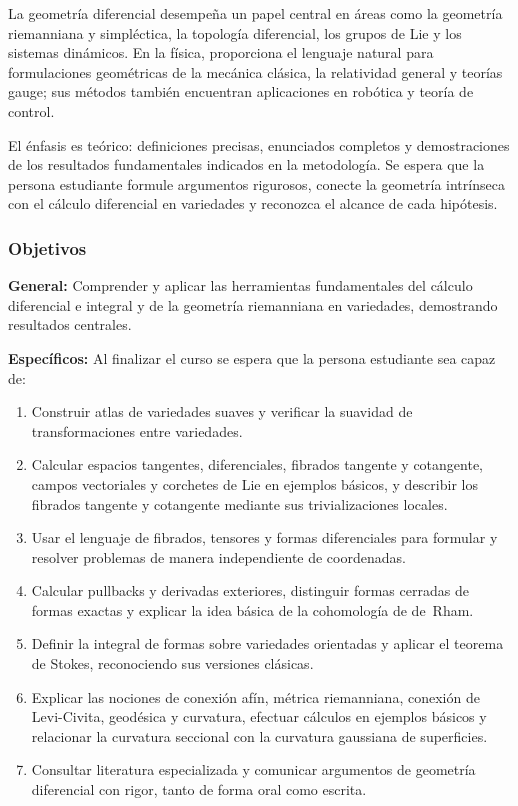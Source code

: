 \begin{refsection}
La geometría diferencial desempeña un papel central en áreas como la geometría riemanniana y simpléctica, la topología diferencial, los grupos de Lie y los sistemas dinámicos. En la física, proporciona el lenguaje natural para formulaciones geométricas de la mecánica clásica, la relatividad general y teorías gauge; sus métodos también encuentran aplicaciones en robótica y teoría de control.

El énfasis es teórico: definiciones precisas, enunciados completos y demostraciones de los resultados fundamentales indicados en la metodología. Se espera que la persona estudiante formule argumentos rigurosos, conecte la geometría intrínseca con el cálculo diferencial en variedades y reconozca el alcance de cada hipótesis.

\subsubsection*{Objetivos}

\textbf{General:} Comprender y aplicar las herramientas fundamentales del cálculo diferencial e integral y de la geometría riemanniana en variedades, demostrando resultados centrales.

\textbf{Específicos:} Al finalizar el curso se espera que la persona estudiante sea capaz de:

\begin{enumerate}
\item Construir atlas de variedades suaves y verificar la suavidad de transformaciones entre variedades.
\item Calcular espacios tangentes, diferenciales, fibrados tangente y cotangente, campos vectoriales y corchetes de Lie en ejemplos básicos, y describir los fibrados tangente y cotangente mediante sus trivializaciones locales.
\item Usar el lenguaje de fibrados, tensores y formas diferenciales para formular y resolver problemas de manera independiente de coordenadas.
\item Calcular pullbacks y derivadas exteriores, distinguir formas cerradas de formas exactas y explicar la idea básica de la cohomología de de~Rham.
\item Definir la integral de formas sobre variedades orientadas y aplicar el teorema de Stokes, reconociendo sus versiones clásicas.
\item Explicar las nociones de conexión afín, métrica riemanniana, conexión de Levi-Civita, geodésica y curvatura, efectuar cálculos en ejemplos básicos y relacionar la curvatura seccional con la curvatura gaussiana de superficies.
\item Consultar literatura especializada y comunicar argumentos de geometría diferencial con rigor, tanto de forma oral como escrita.
\end{enumerate}


\end{refsection}
